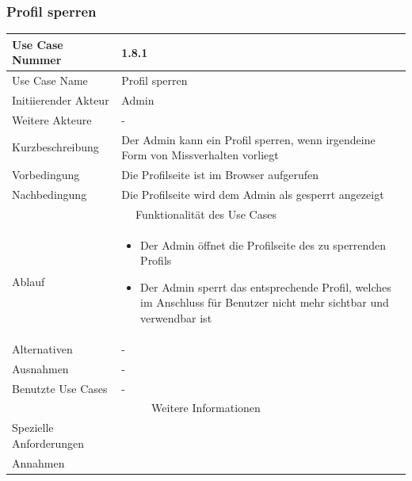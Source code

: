 \documentclass[10pt,a4paper]{article}
\begin{document}
			\subsubsection{Profil sperren}
		\begin{tabular}{|l|p{.5\linewidth}|}
		\hline Use Case Nummer & 1.8.1 \\ 
		\hline Use Case Name & Profil sperren \\ 
		\hline Initiierender Akteur & Admin \\
		\hline Weitere Akteure & - \\
		\hline Kurzbeschreibung & Der Admin kann ein Profil sperren, wenn irgendeine Form von Missverhalten vorliegt \\
		\hline Vorbedingung & Die Profilseite ist im Browser aufgerufen \\
		\hline Nachbedingung & Die Profilseite wird dem Admin als gesperrt angezeigt \\
		\hline \multicolumn{2}{|c|}{Funktionalität des Use Cases}\\
		\hline Ablauf & \begin{itemize}
					\item Der Admin \"offnet die Profilseite des zu sperrenden Profils
					\item Der Admin sperrt das entsprechende Profil, welches im Anschluss f\"ur Benutzer nicht mehr sichtbar und verwendbar ist
				\end{itemize}\\
		\hline Alternativen & - \\
		\hline Ausnahmen & - \\
		\hline Benutzte Use Cases & - \\
		\hline \multicolumn{2}{|c|}{Weitere Informationen} \\
		\hline Spezielle Anforderungen &  \\
		\hline Annahmen &  \\
		\hline
		\end{tabular}
		
\end{document}
